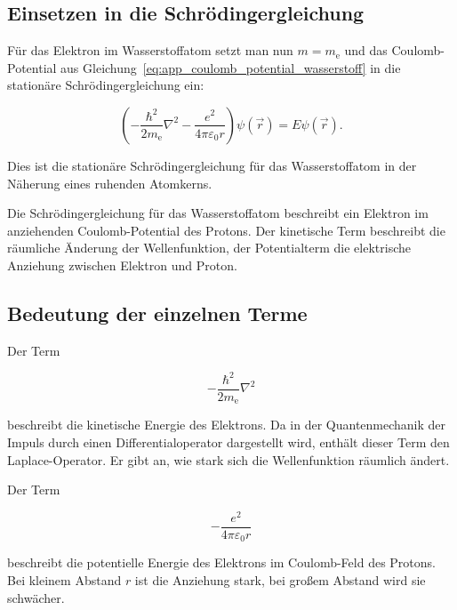\subsection*{Einsetzen in die Schrödingergleichung}

Für das Elektron im Wasserstoffatom setzt man nun \(m = m_\mathrm{e}\) und das
Coulomb-Potential aus Gleichung~\ref{eq:app_coulomb_potential_wasserstoff}
in die stationäre Schrödingergleichung ein:

\begin{equation}
	\left(
	-\frac{\hbar^2}{2m_\mathrm{e}}\nabla^2
	-\frac{e^2}{4\pi\varepsilon_0 r}
	\right)\psi(\vec r)
	=
	E\psi(\vec r).
	\label{eq:app_schroedingergleichung_wasserstoff}
\end{equation}

Dies ist die stationäre Schrödingergleichung für das Wasserstoffatom in der
Näherung eines ruhenden Atomkerns.

\begin{PhysicsBox}
	\label{box:app_schroedingergleichung_wasserstoff}
	Die Schrödingergleichung für das Wasserstoffatom beschreibt ein Elektron im
	anziehenden Coulomb-Potential des Protons. Der kinetische Term beschreibt die
	räumliche Änderung der Wellenfunktion, der Potentialterm die elektrische
	Anziehung zwischen Elektron und Proton.
\end{PhysicsBox}

\subsection*{Bedeutung der einzelnen Terme}

Der Term

\begin{equation}
	-\frac{\hbar^2}{2m_\mathrm{e}}\nabla^2
	\label{eq:app_kinetischer_term_wasserstoff}
\end{equation}

beschreibt die kinetische Energie des Elektrons. Da in der Quantenmechanik der
Impuls durch einen Differentialoperator dargestellt wird, enthält dieser Term
den Laplace-Operator. Er gibt an, wie stark sich die Wellenfunktion räumlich
ändert.

Der Term

\begin{equation}
	-\frac{e^2}{4\pi\varepsilon_0 r}
	\label{eq:app_potentialterm_wasserstoff}
\end{equation}

beschreibt die potentielle Energie des Elektrons im Coulomb-Feld des Protons.
Bei kleinem Abstand \(r\) ist die Anziehung stark, bei großem Abstand wird sie
schwächer.


